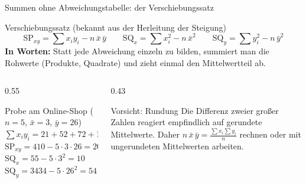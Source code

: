 \documentclass[aspectratio=169,11pt]{beamer}
\newcommand{\mindestzeilenabstand}{%
  \setlength{\lineskiplimit}{2pt}\setlength{\lineskip}{2pt}%
  \setlength{\normallineskiplimit}{2pt}\setlength{\normallineskip}{2pt}}
\newcommand{\SQx}{\text{SQ}_x}
\newcommand{\SQy}{\text{SQ}_y}
\newcommand{\SPxy}{\text{SP}_{xy}}
\begin{document}
\begin{frame}{Summen ohne Abweichungstabelle: der Verschiebungssatz}
  \begin{block}{Verschiebungssatz (bekannt aus der Herleitung der Steigung)}
    \vspace{-3pt}
    \[
      \SPxy = \sum x_i y_i - n\,\bar{x}\,\bar{y}
      \qquad
      \SQx = \sum x_i^{2} - n\,\bar{x}^{2}
      \qquad
      \SQy = \sum y_i^{2} - n\,\bar{y}^{2}
    \]
    \textbf{In Worten:} Statt jede Abweichung einzeln zu bilden, summiert man die
    Rohwerte (Produkte, Quadrate) und zieht einmal den Mittelwertteil ab.
  \end{block}

  \begin{columns}[T]
    \begin{column}{0.55\textwidth}
      \begin{exampleblock}{Probe am Online-Shop ($n = 5$, $\bar{x} = 3$, $\bar{y} = 26$)}
        \small
        $\sum x_i y_i = 21 + 52 + 72 + 120 + 145 = 410$\\
        $\SPxy = 410 - 5 \cdot 3 \cdot 26 = 20$ \checkmark\\[2pt]
        $\SQx = 55 - 5 \cdot 3^{2} = 10$ \checkmark \qquad
        $\SQy = 3434 - 5 \cdot 26^{2} = 54$ \checkmark
      \end{exampleblock}
    \end{column}
    \begin{column}{0.43\textwidth}
      \mindestzeilenabstand
      \begin{alertblock}{Vorsicht: Rundung}
        \small Die Differenz zweier großer Zahlen reagiert empfindlich auf
        gerundete Mittelwerte. Daher $n\,\bar{x}\,\bar{y} = \frac{\sum x_i \sum y_i}{n}$
        rechnen oder mit ungerundeten Mittelwerten arbeiten.
      \end{alertblock}
    \end{column}
  \end{columns}
\end{frame}
\end{document}

